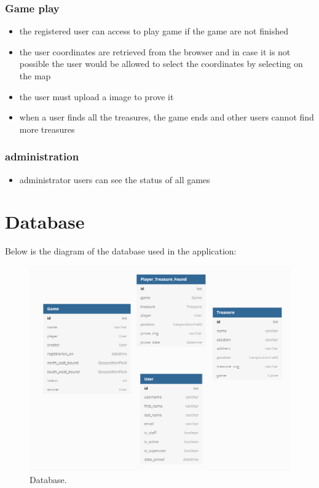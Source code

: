 \documentclass{article}
\begin{document}
\subsubsection{Game play}
\begin{itemize}
	\item the registered user can access to play game if the game are not finished
	\item the user coordinates are retrieved from the browser and in case it is not possible the user would be allowed to select the coordinates by selecting on the map
	\item the user must upload a image to prove it
	\item when a user finds all the treasures, the game ends and other users cannot find more treasures
\end{itemize}
\subsubsection{administration}
\begin{itemize}
	\item administrator users can see the status of all games
\end{itemize}
\section{Database}
Below is the diagram of the database used in the application:
\begin{figure}[H]
	\includegraphics[width=\linewidth]{img/database.PNG}
	\caption{Database.}
	\label{fig:database1}
\end{figure}
  
\end{document}
